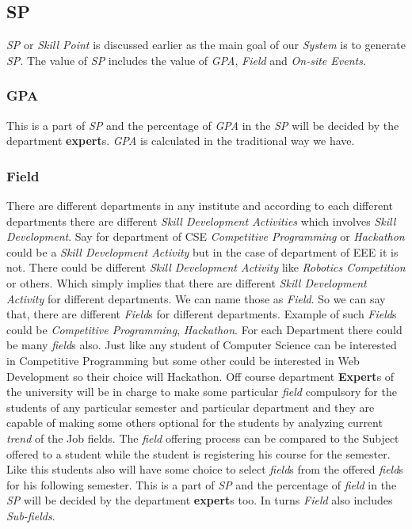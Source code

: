\documentclass[conference]{IEEEtran}
\begin{document}
\subsection{\textbf{SP}}
\textit{SP} or \textit{Skill Point} is discussed earlier as the main goal of our \textit{System} is to generate \textit{SP}. The value of \textit{SP} includes the value of \textit{GPA}, \textit{Field} and \textit{On-site Events}.\\

\subsubsection{\textbf{GPA}}
This is a part of \textit{SP} and the percentage of \textit{GPA} in the \textit{SP} will be decided by the department \textbf{expert}s. \textit{GPA} is calculated in the traditional way we have.\\

\subsubsection{\textbf{Field}}
 There are different departments in any institute and according to each different departments there are different \textit{Skill Development Activities} which involves \textit{Skill Development}. Say for department of CSE \textit{Competitive Programming} or \textit{Hackathon} could be a \textit{Skill Development Activity} but in the case of department of EEE it is not. There could be different \textit{Skill Development Activity} like \textit{Robotics Competition} or others. Which simply implies that there are different \textit{Skill Development Activity} for different departments. We can name those as \textit{Field}. So we can say that, there are different \textit{Field}s for different departments. Example of such \textit{Field}s could be \textit{Competitive Programming}, \textit{Hackathon}. For each Department there could be many \textit{field}s also. Just like any student of Computer Science can be interested in Competitive Programming but some other could be interested in Web Development so their choice will Hackathon. Off course department \textbf{Expert}s of the university will be in charge to make some particular \textit{field} compulsory for the students of any particular semester and particular department and they are capable of making some others optional for the students by analyzing current \textit{trend} of the Job fields. The \textit{field} offering process can be compared to the Subject offered to a student while the student is registering his course for the semester. Like this students also will have some choice to select \textit{field}s from the offered \textit{field}s for his following semester. This is a part of \textit{SP} and the percentage of \textit{field} in the \textit{SP} will be decided by the department \textbf{expert}s too. In turns \textit{Field} also includes \textit{Sub-fields}.\\
 
\end{document}
